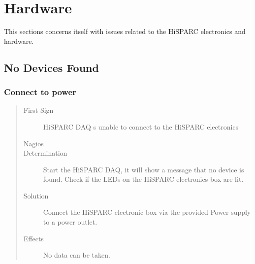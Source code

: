 \documentclass[a4paper,11pt,english]{sphinxmanual}
\begin{document}
\section{Hardware}
\label{known-issues:hardware}
This sections concerns itself with issues related to the HiSPARC
electronics and hardware.


\subsection{No Devices Found}
\label{known-issues:no-devices-found}

\subsubsection{Connect to power}
\label{known-issues:connect-to-power}\begin{quote}\begin{description}
\item[{First Sign}] \leavevmode
HiSPARC DAQ s unable to connect to the HiSPARC electronics

\item[{Nagios}] \leavevmode
\item[{Determination}] \leavevmode
Start the HiSPARC DAQ, it will show a message that no device is found. Check if the LEDs on the HiSPARC electronics box are lit.

\item[{Solution}] \leavevmode
Connect the HiSPARC electronic box via the provided Power supply to a power outlet.

\item[{Effects}] \leavevmode
No data can be taken.

\end{description}\end{quote}



\renewcommand{\indexname}{Index}
\printindex
\end{document}
